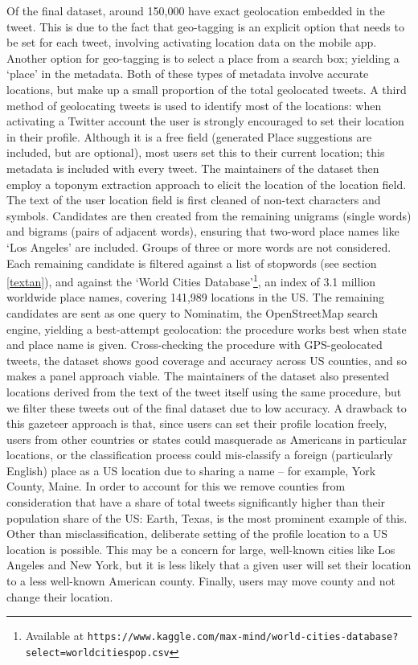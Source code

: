 \documentclass{article}
\begin{document}
Of the final dataset, around 150,000 have exact geolocation embedded in the tweet. This is due to the fact that geo-tagging is an explicit option that needs to be set for each tweet, involving activating location data on the mobile app. Another option for geo-tagging is to select a place from a search box; yielding a `place' in the metadata. Both of these types of metadata involve accurate locations, but make up a small proportion of the total geolocated tweets. A third method of geolocating tweets is used to identify most of the locations: when activating a Twitter account the user is strongly encouraged to set their location in their profile. Although it is a free field (generated Place suggestions are included, but are optional), most users set this to their current location; this metadata is included with every tweet. The maintainers of the dataset then employ a toponym extraction approach to elicit the location of the location field. The text of the user location field is first cleaned of non-text characters and symbols. Candidates are then created from the remaining unigrams (single words) and bigrams (pairs of adjacent words), ensuring that two-word place names like `Los Angeles' are included. Groups of three or more words are not considered. Each remaining candidate is filtered against a list of stopwords (see section \ref{textan}), and against the `World Cities Database'\footnote{Available at \texttt{https://www.kaggle.com/max-mind/world-cities-database?select=worldcitiespop.csv}}, an index of 3.1 million worldwide place names, covering 141,989 locations in the US. The remaining candidates are sent as one query to Nominatim, the OpenStreetMap search engine, yielding a best-attempt geolocation: the procedure works best when state and place name is given. Cross-checking the procedure with GPS-geolocated tweets, the dataset shows good coverage and accuracy across US counties, and so makes a panel approach viable. The maintainers of the dataset also presented locations derived from the text of the tweet itself using the same procedure, but we filter these tweets out of the final dataset due to low accuracy. A drawback to this gazeteer approach is that, since users can set their profile location freely, users from other countries or states could masquerade as Americans in particular locations, or the classification process could mis-classify a foreign (particularly English) place as a US location due to sharing a name -- for example, York County, Maine. In order to account for this we remove counties from consideration that have a share of total tweets significantly higher than their population share of the US: Earth, Texas, is the most prominent example of this. Other than misclassification, deliberate setting of the profile location to a US location is possible. This may be a concern for large, well-known cities like Los Angeles and New York, but it is less likely that a given user will set their location to a less well-known American county. Finally, users may move county and not change their location.
\end{document}
